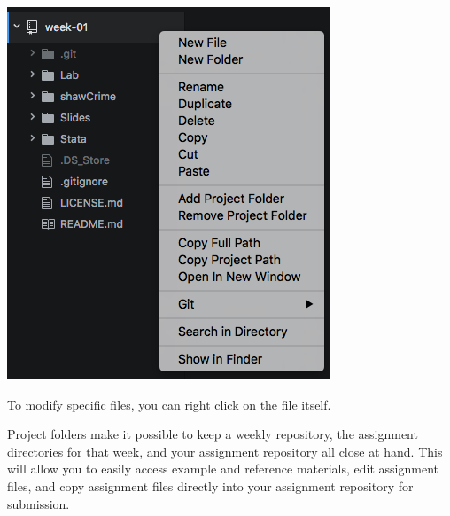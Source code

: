 \documentclass[]{book}
\begin{document}
\includegraphics[width=0.75\linewidth]{images/atomProject}

To modify specific files, you can right click on the file itself.

Project folders make it possible to keep a weekly repository, the
assignment directories for that week, and your assignment repository all
close at hand. This will allow you to easily access example and
reference materials, edit assignment files, and copy assignment files
directly into your assignment repository for submission.


\end{document}
